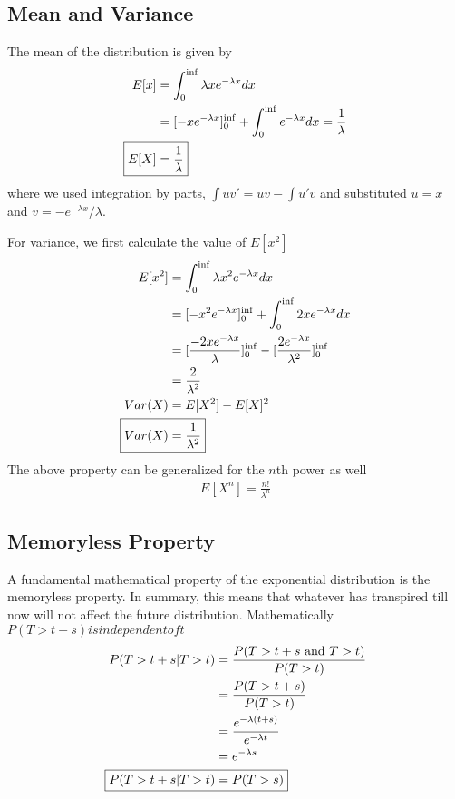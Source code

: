 \documentclass[../probability-notes.tex]{subfiles}
\begin{document}
    \subsection{Mean and Variance}
    The mean of the distribution is given by
    \begin{align*}
        E[x] &= \int_{0}^{\inf} \lambda x e^{-\lambda x} dx\\
        &= [-x e^{-\lambda x}]_{0}^{\inf} + \int_{0}^{\inf} e^{-\lambda x} dx = \frac{1}{\lambda}\\
        \Aboxed{E[X] &= \frac{1}{\lambda}}
    \end{align*}
    where we used integration by parts, $\int uv' = uv - \int u'v$ and substituted $u = x$ and $v = -e^{-\lambda x}/\lambda$.\newline

    For variance, we first calculate the value of $E[x^{2}]$
    \begin{align*}
        E[x^{2}] &= \int_{0}^{\inf} \lambda x^{2} e^{-\lambda x} dx\\
        &= [-x^{2} e^{-\lambda x}]_{0}^{\inf} + \int_{0}^{\inf} 2x e^{-\lambda x} dx\\
        &= [\frac{-2x e^{-\lambda x}}{\lambda}]_{0}^{\inf} - [\frac{2e^{-\lambda x}}{\lambda^{2}}]_{0}^{\inf}\\
        &= \frac{2}{\lambda^{2}}\\
        Var(X) &= E[X^{2}] - E[X]^{2}\\
        \Aboxed{Var(X) &= \frac{1}{\lambda^{2}}}
    \end{align*}
    The above property can be generalized for the $n$th power as well
    \begin{align*}
        E[X^{n}] = \frac{n!}{\lambda^{n}}
    \end{align*}

    \subsection{Memoryless Property}
    A fundamental mathematical property of the exponential distribution is the memoryless property. In summary, this means that whatever has transpired till now will not affect the future distribution. Mathematically $P(T > t+s) is independent of t$
    \begin{align*}
        P(T > t+s | T>t) &= \frac{P(T> t+s \text{ and }T > t)}{P(T > t)}\\
        &= \frac{P(T > t + s)}{P(T > t)}\\
        &= \frac{e^{-\lambda(t+s)}}{e^{-\lambda t}}\\
        &= e^{-\lambda s}\\
        \Aboxed{P(T > t+s | T>t) &= P(T > s)}
    \end{align*}
\end{document}
